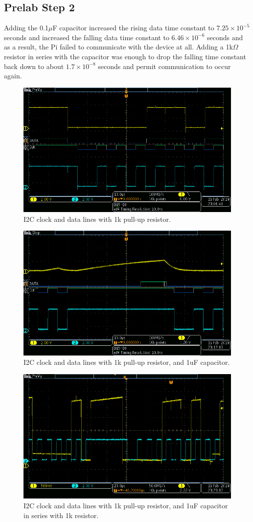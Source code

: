 \documentclass{article}
\begin{document}
\subsection{Prelab Step 2}%
Adding the 0.1$\mu$F capacitor increased the rising data time constant to $7.25 \times 10^{-5}$ seconds and increased the falling data time constant to $6.46 \times 10^{-6}$ seconds and as a result, the Pi failed to communicate with the device at all.
Adding a 1k$\Omega$ resistor in series with the capacitor was enough to drop the falling time constant back down to about $1.7 \times 10^{-8}$ seconds and permit communication to occur again.
\begin{figure}[H]
	\centering
	\includegraphics[keepaspectratio,width=.6\linewidth]{./prelab_screenshots/1.png}
	\caption{I2C clock and data lines with 1k pull-up resistor.}
\end{figure}
\begin{figure}[H]
	\centering
	\includegraphics[keepaspectratio,width=.6\linewidth]{./prelab_screenshots/2.png}
	\caption{I2C clock and data lines with 1k pull-up resistor, and 1uF capacitor.}
\end{figure}
\begin{figure}[H]
	\centering
	\includegraphics[keepaspectratio,width=.6\linewidth]{./prelab_screenshots/3.png}
	\caption{I2C clock and data lines with 1k pull-up resistor, and 1uF capacitor in series with 1k resistor.}
\end{figure}
\end{document}
